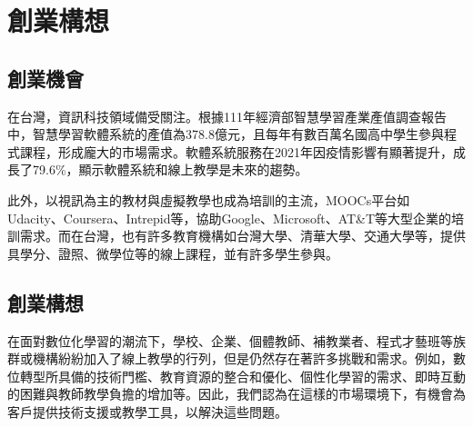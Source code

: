 \section{創業構想}

\subsection{創業機會}
在台灣，資訊科技領域備受關注。根據111年經濟部智慧學習產業產值調查報告\cite{ref:111產業產值調查報告}中，智慧學習軟體系統的產值為378.8億元，且每年有數百萬名國高中學生參與程式課程\cite{ref:學生數量}，形成龐大的市場需求。軟體系統服務在2021年因疫情影響有顯著提升，成長了79.6\%，顯示軟體系統和線上教學是未來的趨勢。

此外，以視訊為主的教材與虛擬教學也成為培訓的主流\cite{ref:企業培訓}，MOOCs平台如Udacity、Coursera、Intrepid等，協助Google、Microsoft、AT\&T等大型企業的培訓需求。而在台灣，也有許多教育機構如台灣大學、清華大學、交通大學等，提供具學分、證照、微學位等的線上課程，並有許多學生參與。

\subsection{創業構想}

在面對數位化學習的潮流下，學校、企業、個體教師、補教業者、程式才藝班等族群或機構紛紛加入了線上教學的行列，但是仍然存在著許多挑戰和需求\cite{ref:111產業產值調查報告}\cite{ref:110產業產值調查報告}。例如，數位轉型所具備的技術門檻、教育資源的整合和優化、個性化學習的需求、即時互動的困難與教師教學負擔的增加\cite{ref:老師的困難}等。因此，我們認為在這樣的市場環境下，有機會為客戶提供技術支援或教學工具，以解決這些問題。

